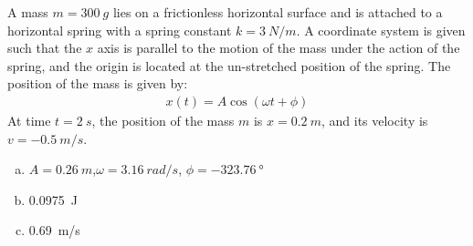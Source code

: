\question A mass $m=\SI{300}{g}$ lies on a frictionless horizontal surface and is attached to a horizontal spring with a spring constant $k=\SI{3}{N/m}$. A coordinate system is given such that the $x$ axis is parallel to the motion of the mass under the action of the spring, and the origin is located at the un-stretched position of the spring. The position of the mass is given by:
\begin{align*}
x(t) = A\cos(\omega t+\phi)
\end{align*}
At time $t=\SI{2}{s}$, the position of the mass $m$ is $x=\SI{0.2}{m}$, and its velocity is $v=\SI{-0.5}{m/s}$.
\begin{finalanswer}
\begin{enumerate}[(a)]
\item $A=\SI{0.26}{m}$,$\omega=\SI{3.16}{rad/s}$, $\phi=\SI{-323.76}{\degree}$
\item \SI{0.0975}{J}
\item \SI{0.69}{m/s}
\end{enumerate}
\end{finalanswer}
